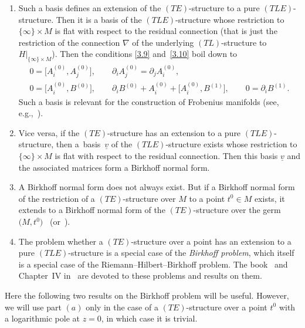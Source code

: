\documentclass[pdftex]{sigma}%
\numberwithin{equation}{section}
\numberwithin{figure}{section}
\newcommand{\uuuu}{\underline}
\newcommand{\paa}{\partial}
\newcommand{\nnn}{\nabla}
\begin{document}
\begin{Remarks}\label{t3.19}\qquad
\begin{enumerate}\itemsep=0pt
\item[$(i)$] Such a basis defines an extension of the
$(TE)$-structure to a pure $(TLE)$-structure.
Then it is a basis of the $(TLE)$-structure
whose restriction
to $\{\infty\}\times M$ is flat with respect to the
residual connection (that is just the restriction
of the connection $\nnn$ of the underlying $(TL)$-structure
to~$H|_{\{\infty\}\times M}$). Then the conditions
\eqref{3.9} and~\eqref{3.10} boil down to
\begin{gather}\label{3.27}
0= \big[A_i^{(0)},A_j^{(0)}\big],\qquad
\paa_iA_j^{(0)}=\paa_jA_i^{(0)},
\\
0= \big[A_i^{(0)},B^{(0)}\big],\qquad
\paa_iB^{(0)}+A_i^{(0)}+\big[A_i^{(0)},B^{(1)}\big],\qquad
0=\paa_iB^{(1)}.\label{3.28}
\end{gather}
Such a basis is relevant for the construction of
Frobenius manifolds (see, e.g.,~\cite{DH20-2}).

\item[$(ii)$] Vice versa, if the $(TE)$-structure has an extension
to a pure $(TLE)$-structure, then a~basis~$\uuuu{v}$
of the $(TLE)$-structure exists whose restriction to
$\{\infty\}\times M$ is flat with respect to the
residual connection.
Then this basis $\uuuu{v}$ and the associated matrices
form a Birkhoff normal form.

\item[$(iii)$] A Birkhoff normal form does not always exist.
But if a Birkhoff normal form of the restriction of
a $(TE)$-structure over $M$ to a point $t^0\in M$
exists, it extends to a Birkhoff normal form
of the $(TE)$-structure over the germ $\big(M,t^0\big)$~\cite[Chapter~VI, Theorem~2.1]{Sa02}
(or~\cite[Theorem~5.1(c)]{DH20-2}).

\item[$(iv)$] The problem whether a $(TE)$-structure over a point
has an extension to a pure $(TLE)$-structure is a
special case of the {\it Birkhoff problem},
which itself is a special case of the Riemann--Hilbert--Birkhoff
problem. The book~\cite{AB94} and Chapter~IV in~\cite{Sa02} are devoted to these problems and results
on them.
\end{enumerate}
\end{Remarks}

Here the following two results on the Birkhoff problem will
be useful. However, we will use part $(a)$ only in the
case of a $(TE)$-structure over a point $t^0$ with
a logarithmic pole at $z=0$, in which case it is trivial.
\end{document}
